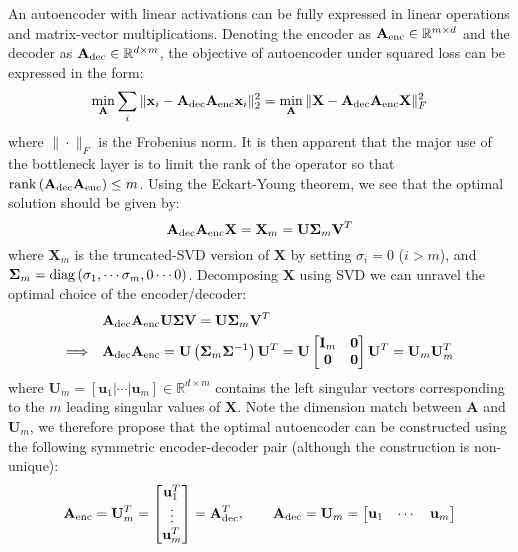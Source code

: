 \documentclass[a4paper, 10pt]{article}
\begin{document}
An autoencoder with linear activations can be fully expressed in linear operations and matrix-vector multiplications. Denoting the encoder as $\mathbf{A}_{\rm enc} \in \mathbb{R}^{m\times d}$ and the decoder as $\mathbf{A}_{\rm dec} \in \mathbb{R}^{d\times m}$, the objective of autoencoder under squared loss can be expressed in the form:
\begin{equation}
    \min_{\mathbf{A}} \sum_i \| \mathbf{x}_i - \mathbf{A}_{\rm dec} \mathbf{A}_{\rm enc} \mathbf{x}_i \|_2^2 = \min_{\mathbf{A}} \| \mathbf{X} - \mathbf{A}_{\rm dec} \mathbf{A}_{\rm enc} \mathbf{X} \|_F^2
\end{equation}
where $\|\cdot \|_F$ is the Frobenius norm. It is then apparent that the major use of the bottleneck layer is to limit the rank of the operator so that ${\rm rank} \left(\mathbf{A}_{\rm dec} \mathbf{A}_{\rm enc}\right) \leq m$. Using the Eckart-Young theorem, we see that the optimal solution should be given by:
\begin{equation}
    \mathbf{A}_{\rm dec} \mathbf{A}_{\rm enc} \mathbf{X} = \mathbf{X}_m = \mathbf{U} \bm{\Sigma}_{m} \mathbf{V}^T
\end{equation}
where $\mathbf{X}_m$ is the truncated-SVD version of $\mathbf{X}$ by setting $\sigma_i = 0$ ($i > m$), and $\bm{\Sigma}_m = {\rm diag}\left(\sigma_1, \cdots \sigma_m, 0 \cdots 0\right)$. Decomposing $\mathbf{X}$ using SVD we can unravel the optimal choice of the encoder/decoder:
\begin{equation}
    \begin{aligned}
        &\mathbf{A}_{\rm dec} \mathbf{A}_{\rm enc} \mathbf{U} \bm{\Sigma} \mathbf{V} = \mathbf{U} \bm{\Sigma}_m \mathbf{V}^T \\
        \Longrightarrow \quad 
        &\mathbf{A}_{\rm dec} \mathbf{A}_{\rm enc} = \mathbf{U} \left(\bm{\Sigma}_m \bm{\Sigma}^{-1}\right) \mathbf{U}^T = \mathbf{U} \begin{bmatrix} \mathbf{I}_m & \mathbf{0} \\ \mathbf{0} & \mathbf{0} \end{bmatrix} \mathbf{U}^T = \mathbf{U}_m \mathbf{U}_m^T
    \end{aligned}
\end{equation}
where $\mathbf{U}_m = [\mathbf{u}_1 | \cdots | \mathbf{u}_m] \in \mathbb{R}^{d\times m}$ contains the left singular vectors corresponding to the $m$ leading singular values of $\mathbf{X}$. Note the dimension match between $\mathbf{A}$ and $\mathbf{U}_m$, we therefore propose that the optimal autoencoder can be constructed using the following symmetric encoder-decoder pair (although the construction is non-unique):
\begin{equation}
    \mathbf{A}_{\rm enc} = \mathbf{U}_m^T = \begin{bmatrix}
        \mathbf{u}_1^T \\ \vdots \\ \mathbf{u}_m^T
    \end{bmatrix} = \mathbf{A}_{\rm dec}^T, \qquad 
    \mathbf{A}_{\rm dec} = \mathbf{U}_m = \begin{bmatrix}
        \mathbf{u}_1 & \cdots & \mathbf{u}_m
    \end{bmatrix}
\end{equation}
\end{document}
